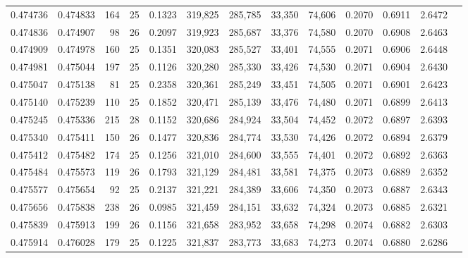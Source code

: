 \begin{tabular}{rrrrrrrrrrrrr}
0.474736 & 0.474833 & 164 &  25 &                                     0.1323 & 319,825 & 285,785 &  33,350 &  74,606 & 0.2070 & 0.6911 & 2.6472 \\
0.474836 & 0.474907 &  98 &  26 &                                     0.2097 & 319,923 & 285,687 &  33,376 &  74,580 & 0.2070 & 0.6908 & 2.6463 \\
0.474909 & 0.474978 & 160 &  25 &                                     0.1351 & 320,083 & 285,527 &  33,401 &  74,555 & 0.2071 & 0.6906 & 2.6448 \\
0.474981 & 0.475044 & 197 &  25 &                                     0.1126 & 320,280 & 285,330 &  33,426 &  74,530 & 0.2071 & 0.6904 & 2.6430 \\
0.475047 & 0.475138 &  81 &  25 &                                     0.2358 & 320,361 & 285,249 &  33,451 &  74,505 & 0.2071 & 0.6901 & 2.6423 \\
0.475140 & 0.475239 & 110 &  25 &                                     0.1852 & 320,471 & 285,139 &  33,476 &  74,480 & 0.2071 & 0.6899 & 2.6413 \\
0.475245 & 0.475336 & 215 &  28 &                                     0.1152 & 320,686 & 284,924 &  33,504 &  74,452 & 0.2072 & 0.6897 & 2.6393 \\
0.475340 & 0.475411 & 150 &  26 &                                     0.1477 & 320,836 & 284,774 &  33,530 &  74,426 & 0.2072 & 0.6894 & 2.6379 \\
0.475412 & 0.475482 & 174 &  25 &                                     0.1256 & 321,010 & 284,600 &  33,555 &  74,401 & 0.2072 & 0.6892 & 2.6363 \\
0.475484 & 0.475573 & 119 &  26 &                                     0.1793 & 321,129 & 284,481 &  33,581 &  74,375 & 0.2073 & 0.6889 & 2.6352 \\
0.475577 & 0.475654 &  92 &  25 &                                     0.2137 & 321,221 & 284,389 &  33,606 &  74,350 & 0.2073 & 0.6887 & 2.6343 \\
0.475656 & 0.475838 & 238 &  26 &                                     0.0985 & 321,459 & 284,151 &  33,632 &  74,324 & 0.2073 & 0.6885 & 2.6321 \\
0.475839 & 0.475913 & 199 &  26 &                                     0.1156 & 321,658 & 283,952 &  33,658 &  74,298 & 0.2074 & 0.6882 & 2.6303 \\
0.475914 & 0.476028 & 179 &  25 &                                     0.1225 & 321,837 & 283,773 &  33,683 &  74,273 & 0.2074 & 0.6880 & 2.6286 \\

\end{tabular}
